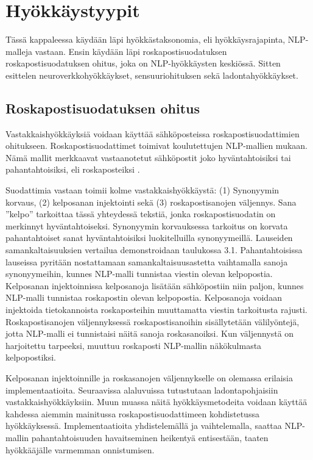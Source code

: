 \chapter{Hyökkäystyypit\label{results}}

Tässä kappaleessa käydään läpi hyökkästaksonomia, eli hyökkäysrajapinta, NLP-malleja vastaan. Ensin käydään läpi roskapostisuodatuksen roskapostisuodatuksen ohitus, joka on NLP-hyökkäysten keskiössä. Sitten esittelen neuroverkkohyökkäykset, sensuuriohituksen sekä ladontahyökkäykset.

\section{Roskapostisuodatuksen ohitus}
Vastakkaishyökkäyksiä voidaan käyttää sähköposteissa roskapostisuodattimien ohitukseen. Roskapostisuodattimet toimivat koulutettujen NLP-mallien mukaan. Nämä mallit merkkaavat vastaanotetut sähköpostit joko hyväntahtoisiksi tai pahantahtoisiksi, eli roskaposteiksi \citep{spamfilter}.

Suodattimia vastaan toimii kolme vastakkaishyökkäystä: (1) Synonyymin korvaus, (2) kelposanan injektointi sekä (3) roskapostisanojen väljennys. Sana ''kelpo'' tarkoittaa tässä yhteydessä tekstiä, jonka roskapostisuodatin on merkinnyt hyväntahtoiseksi. Synonyymin korvauksessa tarkoitus on korvata pahantahtoiset sanat hyväntahtoisiksi luokitelluilla synonyymeillä. Lauseiden samankaltaisuuksien vertailua demonstroidaan taulukossa 3.1. Pahantahtoisissa lauseissa pyritään nostattamaan samankaltaisuusastetta vaihtamalla sanoja synonyymeihin, kunnes NLP-malli tunnistaa viestin olevan kelpopostia. Kelposanan injektoinnissa kelposanoja lisätään sähköpostiin niin paljon, kunnes NLP-malli tunnistaa roskapostin olevan kelpopostia. Kelposanoja voidaan injektoida tietokannoista roskaposteihin muuttamatta viestin tarkoitusta rajusti. Roskapostisanojen väljennyksessä roskapostisanoihin sisällytetään välilyöntejä, jotta NLP-malli ei tunnistaisi näitä sanoja roskasanoiksi. Kun väljennystä on harjoitettu tarpeeksi, muuttuu roskaposti NLP-mallin näkökulmasta kelpopostiksi. \citep{spamfilter}

Kelposanan injektoinnille ja roskasanojen väljennykselle on olemassa erilaisia implementaatioita. Seuraavissa alaluvuissa tutustutaan ladontapohjaisiin vastakkaishyökkäyksiin. Muun muassa näitä hyökkäysmetodeita voidaan käyttää kahdessa aiemmin mainitussa roskapostisuodattimeen kohdistetussa hyökkäyksessä. Implementaatioita yhdistelemällä ja vaihtelemalla, saattaa NLP-mallin pahantahtoisuuden havaitseminen heikentyä entisestään, taaten hyökkääjälle varmemman onnistumisen.

